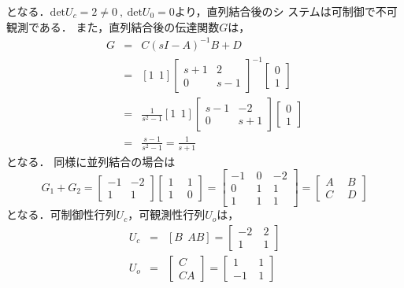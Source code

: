 \documentclass[a4paper,12pt]{jarticle}
\begin{document}
%
となる．$\mathrm{det}U_c=2\neq0~,~\mathrm{det}U_0=0$より，直列結合後のシ
ステムは可制御で不可観測である．
%
また，直列結合後の伝達関数$G$は，
%
\begin{eqnarray}
 G&=&C(sI-A)^{-1}B+D \nonumber\\
 &=&[1~~1]\left[
  \begin{array}{cc}
  s+1 &  2  \\ 
   0  & s-1    
  \end{array}
\right]^{-1}\left[
  \begin{array}{c}
   0  \\ 
   1      
  \end{array}
\right] \nonumber\\
  &=&\frac{1}{s^2-1}[1~~1]\left[
  \begin{array}{cc}
  s-1 &  -2  \\ 
   0  & s+1    
  \end{array}
\right]\left[
  \begin{array}{c}
   0  \\ 
   1      
  \end{array}
\right] \nonumber\\
&=&\frac{s-1}{s^2-1}=\frac{1}{s+1}
\end{eqnarray}
%
となる．
%
同様に並列結合の場合は
%
\begin{equation}
 G_1+G_2=\left[
  \begin{array}{c|c}
  -1 & -2  \\ \hline
   1 & 1    
  \end{array}
  \right] \left[
  \begin{array}{c|c}
  1 ~&~ 1  \\ \hline
  1 ~&~ 0    
  \end{array}
  \right]=\left[
  \begin{array}{cc|c}
  -1 &~  0 ~& -2  \\ 
  0  &~  1 ~& 1  \\\hline
  1  &~  1 ~& 1
  \end{array}
  \right]=\left[
  \begin{array}{c|c}
  A ~&~ B  \\ \hline
  C ~&~ D    
  \end{array}
  \right]
  \end{equation}
%
となる．可制御性行列$U_c$，可観測性行列$U_o$は，
%
\begin{eqnarray}
 U_c&=&[B~~AB]=\left[
  \begin{array}{cc}
  -2 &~ 2  \\ 
  1  &~ 1    
  \end{array}
\right] \\
 U_o&=&\left[
  \begin{array}{c}
  C \\ 
  CA     
  \end{array}
\right]=\left[
  \begin{array}{cc}
  1  &~ 1  \\ 
  -1 &~ 1    
  \end{array}
\right] 
\end{eqnarray}
\end{document}

